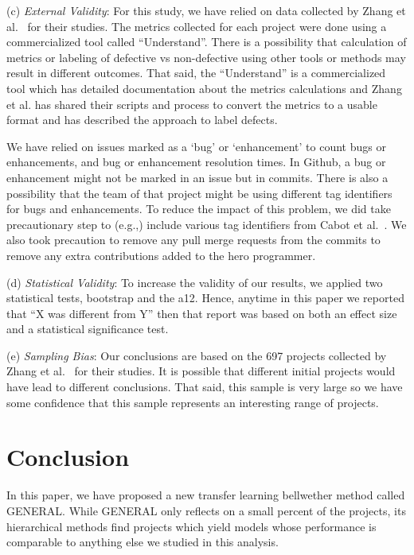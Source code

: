 \documentclass[10pt,journal,compsoc]{IEEEtran}
\begin{document}
(c) \textit{External Validity}: For this study, we have relied on data collected by Zhang et al.~\cite{zhang15} for their studies. The metrics collected for each project were done using a commercialized tool called ``Understand''. There is a possibility that calculation of metrics or labeling of defective vs non-defective using other tools or methods may result in different outcomes. That said, the ``Understand'' is a commercialized tool which has detailed documentation about the metrics calculations and Zhang et al. has shared their scripts and process to convert the metrics to a usable format and has described the approach to label defects.  

We have relied on issues marked as a `bug' or `enhancement' to count bugs or enhancements, and bug or enhancement resolution times. In Github, a bug or enhancement might not be marked in an issue but in commits. There is also a possibility that the team of that project might be using different tag identifiers for bugs and enhancements. To reduce the impact of this problem, we  did take precautionary step to (e.g.,) include various tag identifiers from Cabot et al.~\cite{cabot2015exploring}. We also took precaution to remove any pull merge requests from the commits to remove any extra contributions added to the hero programmer. 

(d) \textit{Statistical Validity}: To increase the validity of our results, we applied two statistical tests, bootstrap and the a12. Hence, anytime in this paper we reported that ``X was different from Y'' then that report was based on both an effect size and a statistical significance test.
 
(e) \textit{Sampling Bias}: Our conclusions are based on the 697 projects collected by Zhang et al.~\cite{zhang15} for their studies. It is possible that different initial projects would have lead to different conclusions. That said, this sample is very large so we have some confidence that this sample represents an interesting range of projects.  
 



\section{Conclusion}
\label{sec:concl}
In this paper, we have proposed a new transfer learning  bellwether method   called GENERAL.
While GENERAL only reflects on a small percent of the projects,
its hierarchical methods find projects which yield models
whose performance is comparable to anything else we studied
in this analysis.
 
\end{document}
